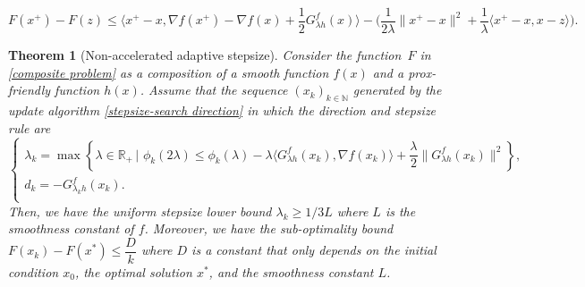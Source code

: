 \documentclass[10pt,a4paper]{amsart}
\newtheorem{theorem}{Theorem}
\begin{document}
\begin{equation*}
F(x^+) - F(z) \leq \langle x^+ - x,  \nabla f(x^+) - \nabla f(x) + \dfrac{1}{2}G^{f}_{\lambda h}(x) \rangle - \Big( \dfrac{1}{2\lambda} \|x^+ - x\|^2 + \dfrac{1}{\lambda}\langle x^+ -x, x - z \rangle \Big).
\end{equation*}

\begin{theorem}[Non-accelerated adaptive stepsize]\label{theorem1}
Consider the function~$F$ in \eqref{composite problem} as a composition of a smooth function $f(x)$ and a prox-friendly function $h(x)$. Assume that the sequence $\left (x_k \right)_{k \in \mathbb{N}}$ generated by the update algorithm \eqref{stepsize-search direction} in which the direction and stepsize rule are
\begin{equation*}\label{alg:Algorithm1}
\tag{Alg.\,1}
\begin{cases}
  \lambda_k = \max\limits \left \{\lambda \in \mathbb{R}_+ \,|\,\, \phi_k(2\lambda) \leq \phi_k(\lambda) - \lambda \langle G^{f}_{\lambda h}(x_k), \nabla f(x_k) \rangle + \dfrac{\lambda}{2}\|G^{f}_{\lambda h}(x_k)\|^2\right\},\\      
  d_k = -G^{f}_{\lambda_k h}(x_k).\\
\end{cases}
\end{equation*}
Then, we have the uniform stepsize lower bound $\lambda_k \geq {1}/{3L}$ where $L$ is the smoothness constant of $f$. Moreover, we have the sub-optimality bound $F(x_k) - F(x^*) \leq \dfrac{D}{k}$ where $D$ is a constant that only depends on the initial condition $x_0$, the optimal solution $x^*$, and the smoothness constant $L$.
\end{theorem}
\end{document}
